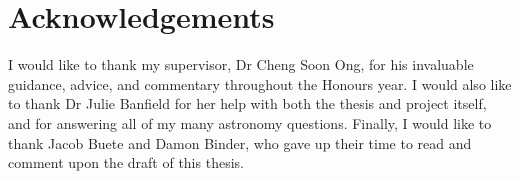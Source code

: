 
\chapter*{Acknowledgements}
\label{cha:ack}

    I would like to thank my supervisor, Dr Cheng Soon Ong, for his invaluable
    guidance, advice, and commentary throughout the Honours year. I would also
    like to thank Dr Julie Banfield for her help with both the thesis and
    project itself, and for answering all of my many astronomy questions.
    Finally, I would like to thank Jacob Buete and Damon Binder, who gave up
    their time to read and comment upon the draft of this thesis.


